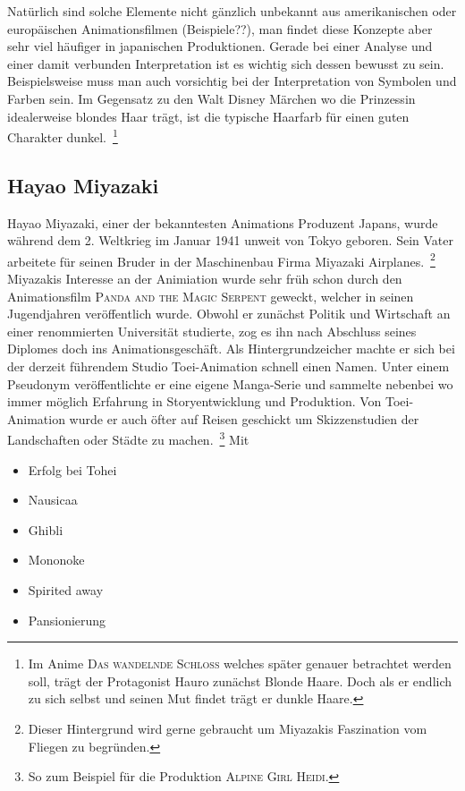 Natürlich sind solche Elemente nicht gänzlich unbekannt aus amerikanischen oder europäischen Animationsfilmen (Beispiele??), man findet diese Konzepte aber sehr viel häufiger in japanischen Produktionen. Gerade bei einer Analyse und einer damit verbunden Interpretation ist es wichtig sich dessen bewusst zu sein. Beispielsweise muss man auch vorsichtig bei der Interpretation von Symbolen und Farben sein. Im Gegensatz zu den Walt Disney Märchen wo die Prinzessin idealerweise blondes Haar trägt, ist die typische Haarfarb für einen guten Charakter dunkel.~\footnote{Im Anime \textsc{Das wandelnde Schloss} welches später genauer betrachtet werden soll, trägt der Protagonist Hauro zunächst Blonde Haare. Doch als er endlich zu sich selbst und seinen Mut findet trägt er dunkle Haare.} 

\subsection{Hayao Miyazaki}

Hayao Miyazaki, einer der bekanntesten Animations Produzent Japans, wurde während dem 2. Weltkrieg im Januar 1941 unweit von Tokyo geboren. Sein Vater arbeitete für seinen Bruder in der Maschinenbau Firma Miyazaki Airplanes.~\footnote{Dieser Hintergrund wird gerne gebraucht um Miyazakis Faszination vom Fliegen zu begründen.} Miyazakis Interesse an der Animiation wurde sehr früh schon durch den Animationsfilm \textsc{Panda and the Magic Serpent} geweckt, welcher in seinen Jugendjahren veröffentlich wurde. Obwohl er zunächst Politik und Wirtschaft an einer renommierten Universität studierte, zog es ihn nach Abschluss seines Diplomes doch ins Animationsgeschäft. Als Hintergrundzeicher machte er sich bei der derzeit führendem Studio Toei-Animation schnell einen Namen. Unter einem Pseudonym veröffentlichte er eine eigene Manga-Serie und sammelte nebenbei wo immer möglich Erfahrung in Storyentwicklung und Produktion. Von Toei-Animation wurde er auch öfter auf Reisen geschickt um Skizzenstudien der Landschaften oder Städte zu machen.~\footnote{So zum Beispiel für die Produktion \textsc{Alpine Girl Heidi}.} Mit
\begin{itemize}
	\item Erfolg bei Tohei
	\item Nausicaa
	\item Ghibli
	\item Mononoke
	\item Spirited away
	\item Pansionierung
\end{itemize} 

